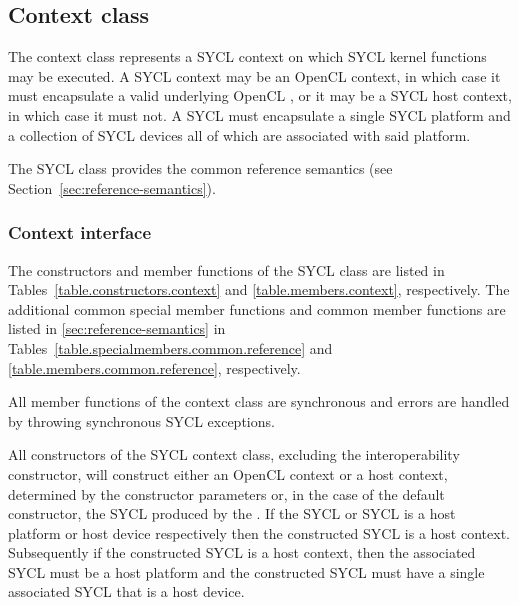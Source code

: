 \subsection{Context class}
\label{sec:interface.context.class}

The \gls{context} class represents a SYCL \gls{context} on which SYCL kernel functions may be executed. A SYCL \gls{context} may be an OpenCL context, in which case it must encapsulate a valid underlying OpenCL , or it may be a SYCL host context, in which case it must not. A SYCL  must encapsulate a single SYCL \gls{platform} and a collection of SYCL \gls{device}s all of which are associated with said \gls{platform}.

The SYCL  class provides the common reference semantics
(see Section~\ref{sec:reference-semantics}).


\subsubsection{Context interface}

The constructors and member functions of the SYCL  class are listed in Tables~\ref{table.constructors.context} and \ref{table.members.context}, respectively. The additional common special member functions and common member functions are listed in \ref{sec:reference-semantics} in Tables~\ref{table.specialmembers.common.reference} and \ref{table.members.common.reference}, respectively.

All member functions of the \gls{context} class are synchronous and errors are handled by throwing synchronous SYCL exceptions.

All constructors of the SYCL \gls{context} class, excluding the interoperability constructor, will construct either an OpenCL context or a host context, determined by the constructor parameters or, in the case of the default constructor, the SYCL  produced by the . If the SYCL  or SYCL  is a host platform or host device respectively then the constructed SYCL  is a host context. Subsequently if the constructed SYCL  is a host context, then the associated SYCL  must be a host platform and the constructed SYCL  must have a single associated SYCL  that is a host device.

